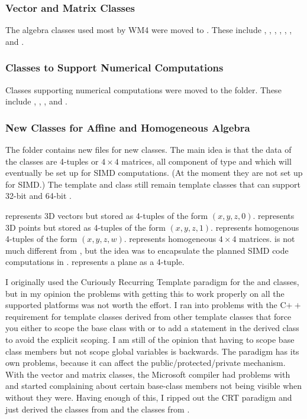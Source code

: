 \documentclass{article}
\begin{document}
\subsubsection{Vector and Matrix Classes}

The algebra classes used most by WM4 were moved to .  These include
, , , , ,
, and .

\subsubsection{Classes to Support Numerical Computations}

Classes supporting numerical computations were moved to the 
folder.  These include , , ,
and .

\subsubsection{New Classes for Affine and Homogeneous Algebra}

The  folder contains new files for new classes.  The main idea
is that the data of the classes are 4-tuples or $4 \times 4$ matrices, all
component of type  and which will eventually be set up for SIMD
computations.  (At the moment they are not set up for SIMD.)  The template
 and  class still remain template classes that
can support 32-bit  and 64-bit .

 represents 3D vectors but stored as 4-tuples of the form
$(x,y,z,0)$.   represents 3D points but stored as 4-tuples of
the form $(x,y,z,1)$.   represents homogenous 4-tuples of the
form $(x,y,z,w)$.   represents homogeneous $4 \times 4$
matrices.   is not much different from ,
but the idea was to encapsulate the planned SIMD code computations in
.   represents a plane as a 4-tuple.

I originally used the Curiously Recurring Template paradigm for the
 and  classes, but in my opinion the problems with
getting this to work properly on all the supported platforms was not worth
the effort.  I ran into problems with the C$++$ requirement for template
classes derived from other template classes that force you either to scope
the base class with  or to add a 
statement in the derived class to avoid the explicit scoping.  I am still
of the opinion that having to scope base class members but not scope global
variables is backwards.  The  paradigm has its own problems,
because it can affect the public/protected/private mechanism.  With the
vector and matrix classes, the Microsoft compiler had problems with
 and started complaining about certain base-class members
not being visible when without  they were.  Having enough
of this, I ripped out the CRT paradigm and just derived the
 classes from  and the  classes
from .
\end{document}
